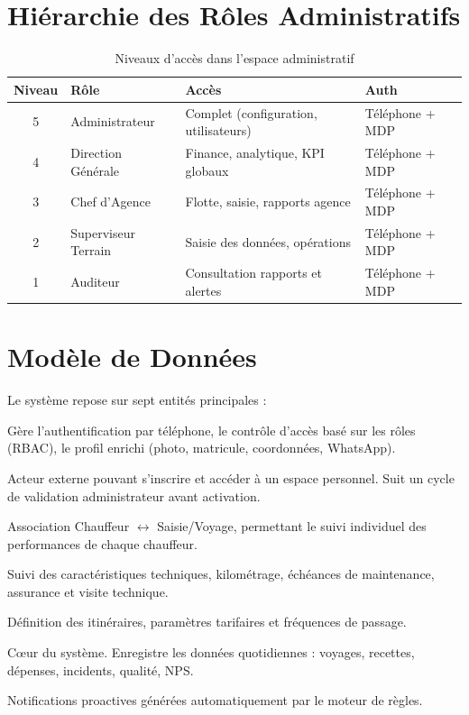 \documentclass[12pt,a4paper]{report}
\begin{document}
\section{Hiérarchie des Rôles Administratifs}

\begin{table}[h!]
\centering
\caption{Niveaux d'accès dans l'espace administratif}
\begin{tabular}{clll}
\toprule
\textbf{Niveau} & \textbf{Rôle} & \textbf{Accès} & \textbf{Auth} \\
\midrule
5 & Administrateur      & Complet (configuration, utilisateurs) & Téléphone + MDP \\
4 & Direction Générale  & Finance, analytique, KPI globaux      & Téléphone + MDP \\
3 & Chef d'Agence       & Flotte, saisie, rapports agence       & Téléphone + MDP \\
2 & Superviseur Terrain & Saisie des données, opérations        & Téléphone + MDP \\
1 & Auditeur            & Consultation rapports et alertes      & Téléphone + MDP \\
\bottomrule
\end{tabular}
\end{table}

\section{Modèle de Données}

Le système repose sur sept entités principales :

\begin{description}[leftmargin=2cm, style=nextline]
    \item[\texttt{Utilisateur}]
        Gère l'authentification par téléphone, le contrôle d'accès basé sur les
        rôles (RBAC), le profil enrichi (photo, matricule, coordonnées, WhatsApp).
    \item[\texttt{Chauffeur}]
        Acteur externe pouvant s'inscrire et accéder à un espace personnel.
        Suit un cycle de validation administrateur avant activation.
    \item[\texttt{CourseChauffeur}]
        Association Chauffeur $\leftrightarrow$ Saisie/Voyage, permettant le suivi
        individuel des performances de chaque chauffeur.
    \item[\texttt{Vehicule}]
        Suivi des caractéristiques techniques, kilométrage, échéances de
        maintenance, assurance et visite technique.
    \item[\texttt{Ligne}]
        Définition des itinéraires, paramètres tarifaires et fréquences de passage.
    \item[\texttt{Saisie}]
        Cœur du système. Enregistre les données quotidiennes : voyages, recettes,
        dépenses, incidents, qualité, NPS.
    \item[\texttt{Alerte}]
        Notifications proactives générées automatiquement par le moteur de règles.
\end{description}
\end{document}
